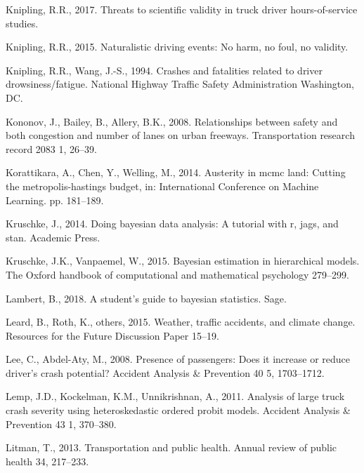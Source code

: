 \documentclass[12pt]{book}
\numberwithin{equation}{chapter}
\begin{document}
\leavevmode\hypertarget{ref-knipling2017threats}{}%
Knipling, R.R., 2017. Threats to scientific validity in truck driver hours-of-service studies.

\leavevmode\hypertarget{ref-knipling2015naturalistic}{}%
Knipling, R.R., 2015. Naturalistic driving events: No harm, no foul, no validity.

\leavevmode\hypertarget{ref-knipling1994crashes}{}%
Knipling, R.R., Wang, J.-S., 1994. Crashes and fatalities related to driver drowsiness/fatigue. National Highway Traffic Safety Administration Washington, DC.

\leavevmode\hypertarget{ref-kononov2008relationships}{}%
Kononov, J., Bailey, B., Allery, B.K., 2008. Relationships between safety and both congestion and number of lanes on urban freeways. Transportation research record 2083 1, 26--39.

\leavevmode\hypertarget{ref-korattikara2014austerity}{}%
Korattikara, A., Chen, Y., Welling, M., 2014. Austerity in mcmc land: Cutting the metropolis-hastings budget, in: International Conference on Machine Learning. pp. 181--189.

\leavevmode\hypertarget{ref-kruschke2014doing}{}%
Kruschke, J., 2014. Doing bayesian data analysis: A tutorial with r, jags, and stan. Academic Press.

\leavevmode\hypertarget{ref-kruschke2015bayesian}{}%
Kruschke, J.K., Vanpaemel, W., 2015. Bayesian estimation in hierarchical models. The Oxford handbook of computational and mathematical psychology 279--299.

\leavevmode\hypertarget{ref-lambert2018student}{}%
Lambert, B., 2018. A student's guide to bayesian statistics. Sage.

\leavevmode\hypertarget{ref-leard2015weather}{}%
Leard, B., Roth, K., others, 2015. Weather, traffic accidents, and climate change. Resources for the Future Discussion Paper 15--19.

\leavevmode\hypertarget{ref-lee2008presence}{}%
Lee, C., Abdel-Aty, M., 2008. Presence of passengers: Does it increase or reduce driver's crash potential? Accident Analysis \& Prevention 40 5, 1703--1712.

\leavevmode\hypertarget{ref-lemp2011analysis}{}%
Lemp, J.D., Kockelman, K.M., Unnikrishnan, A., 2011. Analysis of large truck crash severity using heteroskedastic ordered probit models. Accident Analysis \& Prevention 43 1, 370--380.

\leavevmode\hypertarget{ref-litman2013transportation}{}%
Litman, T., 2013. Transportation and public health. Annual review of public health 34, 217--233.
\end{document}
